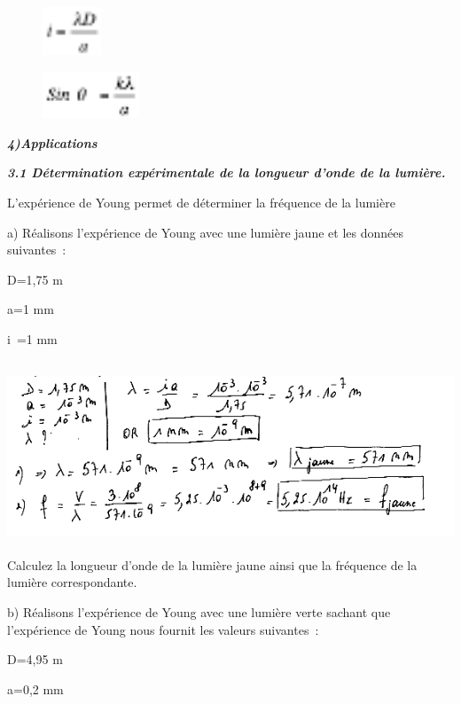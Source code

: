 \begin{figure}
\centering
\includegraphics[width=1.757cm,height=1.432cm]{Pictures/100000010000001A000000159D382765312EA964.png}
\caption{}
\end{figure}

\begin{figure}
\centering
\includegraphics[width=2.894cm,height=1.389cm]{Pictures/100000010000002C0000001558E0CCA95D4F59EB.png}
\caption{}
\end{figure}

\emph{\textbf{4)Applications}}

\emph{\textbf{3.1 Détermination expérimentale de la longueur d'onde de
la lumière. }}

L'expérience de Young permet de déterminer la fréquence de la lumière

a) Réalisons l'expérience de Young avec une lumière jaune et les données
suivantes~:

D=1,75 m

a=1 mm

i~=1 mm

\includegraphics[width=16.82cm,height=5.733cm]{Pictures/1000000100000243000000D01464CBCF0F7AAEC1.png}Calculez
la longueur d'onde de la lumière jaune ainsi que la fréquence de la
lumière correspondante.

b)\textbf{ }Réalisons l'expérience de Young avec une lumière verte
sachant que l'expérience de Young nous fournit les valeurs suivantes~:

D=4,95 m

a=0,2 mm

